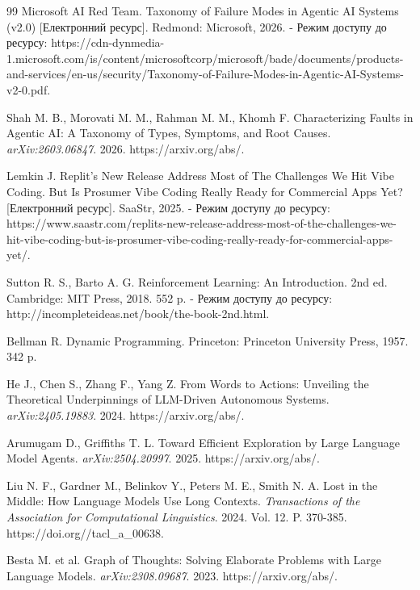 \documentclass[12pt, reqno, a4paper]{amsart}
\theoremstyle{definition}
\theoremstyle{plain}
\theoremstyle{plain}
\theoremstyle{plain}
\theoremstyle{remark}
\theoremstyle{plain}
\begin{document}
{\begin{thebibliography}{99}
 Microsoft AI Red Team. Taxonomy of Failure Modes in Agentic AI Systems (v2.0) [Електронний ресурс]. Redmond: Microsoft, 2026. - Режим доступу до ресурсу: https://cdn-dynmedia-1.microsoft.com/\allowbreak is/\allowbreak content/\allowbreak microsoftcorp/\allowbreak microsoft/\allowbreak bade/\allowbreak documents/\allowbreak products-and-services/\allowbreak en-us/\allowbreak security/\allowbreak Taxonomy-of-Failure-Modes-in-Agentic-AI-Systems-v2-0.pdf.

 Shah M. B., Morovati M. M., Rahman M. M., Khomh F. Characterizing Faults in Agentic AI: A Taxonomy of Types, Symptoms, and Root Causes. \emph{arXiv:2603.06847}. 2026. https://arxiv.org/\allowbreak abs/.

 Lemkin J. Replit's New Release Address Most of The Challenges We Hit Vibe Coding. But Is Prosumer Vibe Coding Really Ready for Commercial Apps Yet? [Електронний ресурс]. SaaStr, 2025. - Режим доступу до ресурсу: https://www.saastr.com/\allowbreak replits-new-release-address-most-of-the-challenges-we-hit-vibe-coding-but-is-prosumer-vibe-coding-really-ready-for-commercial-apps-yet/.

 Sutton R. S., Barto A. G. Reinforcement Learning: An Introduction. 2nd ed. Cambridge: MIT Press, 2018. 552 p. - Режим доступу до ресурсу: http://incompleteideas.net/\allowbreak book/\allowbreak the-book-2nd.html.

 Bellman R. Dynamic Programming. Princeton: Princeton University Press, 1957. 342 p.

 He J., Chen S., Zhang F., Yang Z. From Words to Actions: Unveiling the Theoretical Underpinnings of LLM-Driven Autonomous Systems. \emph{arXiv:2405.19883}. 2024. https://arxiv.org/\allowbreak abs/.

 Arumugam D., Griffiths T. L. Toward Efficient Exploration by Large Language Model Agents. \emph{arXiv:2504.20997}. 2025. https://arxiv.org/\allowbreak abs/.

 Liu N. F., Gardner M., Belinkov Y., Peters M. E., Smith N. A. Lost in the Middle: How Language Models Use Long Contexts. \emph{Transactions of the Association for Computational Linguistics}. 2024. Vol. 12. P. 370-385. https://doi.org//\allowbreak tacl\_a\_00638.

 Besta M. et al. Graph of Thoughts: Solving Elaborate Problems with Large Language Models. \emph{arXiv:2308.09687}. 2023. https://arxiv.org/\allowbreak abs/.


\end{thebibliography}}
\end{document}
